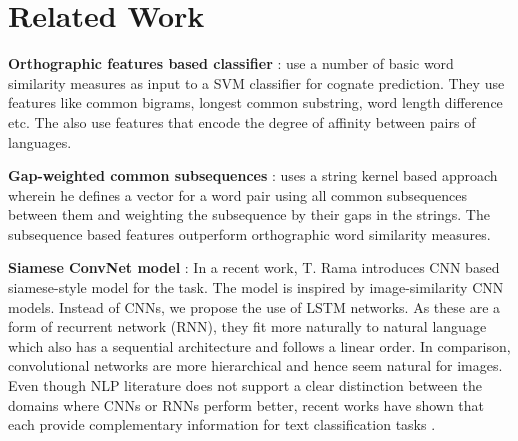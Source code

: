 \documentclass[11pt,letterpaper]{article}
\begin{document}

\section{Related Work}
\textbf{Orthographic features based classifier} : \cite{hauer2011clustering} use a number of basic word similarity measures as input to a SVM classifier for cognate prediction. They use features like common bigrams, longest common substring, word length difference etc. The also use features that encode the degree of affinity between pairs of languages.

\textbf{Gap-weighted common subsequences} : \cite{rama2015automatic} uses a string kernel based approach wherein he defines a vector for a word pair using all common subsequences between them and weighting the subsequence by their gaps in the strings. The subsequence based features outperform orthographic word similarity measures.

\textbf{Siamese ConvNet model} : In a recent work, T. Rama introduces CNN based siamese-style model \cite{rama2016siamese} for the task. The model is inspired by image-similarity CNN models. Instead of CNNs, we propose the use of LSTM networks. As these are a form of recurrent network (RNN), they fit more naturally to natural language which also has a sequential architecture and follows a linear order. In comparison, convolutional networks are more hierarchical and hence seem natural for images. Even though NLP literature does not support a clear distinction between the domains where CNNs or RNNs perform better, recent works have shown that each provide complementary information for text classification tasks \cite{yin2017comparative}. 

\end{document}
